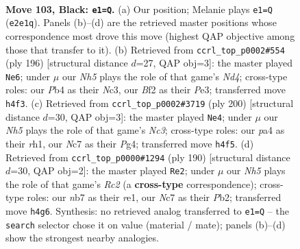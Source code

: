 \documentclass[11pt]{article}
\begin{document}
\clearpage

\begin{figure}[p]\centering
\begin{subfigure}{0.46\textwidth}\centering
\resizebox{\linewidth}{!}{%
\newchessgame
\chessboard[
  setfen={5k2/1Nn5/8/8/Pp2P2n/8/BK2pb1p/8 b - - 3 103},
  showmover=false,
  pgfstyle=straightmove, color=movearrow, markmove={e2-e1}
]}
\caption{}
\end{subfigure}\hfill
\begin{subfigure}{0.46\textwidth}\centering
\resizebox{\linewidth}{!}{%
\newchessgame
\chessboard[
  setfen={b2bk3/8/6p1/6P1/3N4/2N1P3/5K2/8 w - - 3 99},
  showmover=false,
  pgfstyle=straightmove, color=movearrow, markmove={d4-e6}
]}
\caption{}
\end{subfigure}
\\[4pt]
\begin{subfigure}{0.46\textwidth}\centering
\resizebox{\linewidth}{!}{%
\newchessgame
\chessboard[
  setfen={8/6k1/5p2/4pP2/2p3P1/2N5/3B1K2/7r w - - 56 101},
  showmover=false,
  pgfstyle=straightmove, color=movearrow, markmove={c3-e4}
]}
\caption{}
\end{subfigure}\hfill
\begin{subfigure}{0.46\textwidth}\centering
\resizebox{\linewidth}{!}{%
\newchessgame
\chessboard[
  setfen={4b3/4k1p1/8/4K3/1p5P/3B4/1PR5/4r3 w - - 5 96},
  showmover=false,
  pgfstyle=straightmove, color=movearrow, markmove={c2-e2}
]}
\caption{}
\end{subfigure}
\caption{\textbf{Move 103, Black: \texttt{e1=Q}.} (a) Our position; Melanie plays \texttt{e1=Q} (\texttt{e2e1q}). Panels (b)--(d) are the retrieved master positions whose correspondence most drove this move (highest QAP objective among those that transfer to it). (b) Retrieved from \texttt{ccrl\_top\_p0002\#554} (ply 196) [structural distance $d$=27, QAP obj=3]: the master played \texttt{Ne6}; under $\mu$ our \emph{Nh5} plays the role of that game's \emph{Nd4}; cross-type roles: our \emph{P}b4 as their \emph{N}c3, our \emph{B}f2 as their \emph{P}e3; transferred move \texttt{h4f3}. (c) Retrieved from \texttt{ccrl\_top\_p0002\#3719} (ply 200) [structural distance $d$=30, QAP obj=3]: the master played \texttt{Ne4}; under $\mu$ our \emph{Nh5} plays the role of that game's \emph{Nc3}; cross-type roles: our \emph{p}a4 as their \emph{r}h1, our \emph{N}c7 as their \emph{P}g4; transferred move \texttt{h4f5}. (d) Retrieved from \texttt{ccrl\_top\_p0000\#1294} (ply 190) [structural distance $d$=30, QAP obj=2]: the master played \texttt{Re2}; under $\mu$ our \emph{Nh5} plays the role of that game's \emph{Rc2} (a \textbf{cross-type} correspondence); cross-type roles: our \emph{n}b7 as their \emph{r}e1, our \emph{N}c7 as their \emph{P}b2; transferred move \texttt{h4g6}. Synthesis: no retrieved analog transferred to \texttt{e1=Q} -- the \texttt{search} selector chose it on value (material / mate); panels (b)--(d) show the strongest nearby analogies.}
\label{fig:thought-m205}
\end{figure}
\end{document}

